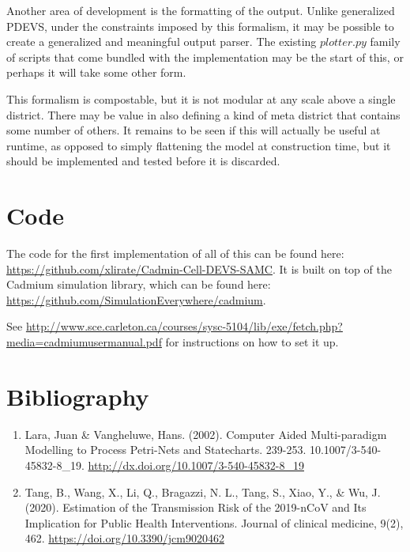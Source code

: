 \documentclass[twocolumn]{article}
\begin{document}
Another area of development is the formatting of the output. Unlike generalized PDEVS, under the constraints imposed by this formalism, it may be possible to create a generalized and meaningful output parser. The existing $plotter.py$ family of scripts that come bundled with the implementation may be the start of this, or perhaps it will take some other form.

This formalism is compostable, but it is not modular at any scale above a single district. There may be value in also defining a kind of meta district that contains some number of others. It remains to be seen if this will actually be useful at runtime, as opposed to simply flattening the model at construction time, but it should be implemented and tested before it is discarded.

\section{Code}

The code for the first implementation of all of this can be found here: \url{https://github.com/xlirate/Cadmin-Cell-DEVS-SAMC}.
It is built on top of the Cadmium simulation library, which can be found here: \url{https://github.com/SimulationEverywhere/cadmium}.

See \url{http://www.sce.carleton.ca/courses/sysc-5104/lib/exe/fetch.php?media=cadmiumusermanual.pdf} for instructions on how to set it up.

\section{Bibliography}

\begin{enumerate}

\item Lara, Juan \& Vangheluwe, Hans. (2002). Computer Aided Multi-paradigm Modelling to Process Petri-Nets and Statecharts. 239-253. 10.1007/3-540-45832-8\_19. \url{http://dx.doi.org/10.1007/3-540-45832-8_19}

\item Tang, B., Wang, X., Li, Q., Bragazzi, N. L., Tang, S., Xiao, Y., \& Wu, J. (2020).
Estimation of the Transmission Risk of the 2019-nCoV and Its Implication for
Public Health Interventions. Journal of clinical medicine, 9(2), 462.
\url{https://doi.org/10.3390/jcm9020462}

\end{enumerate}
\end{document}
